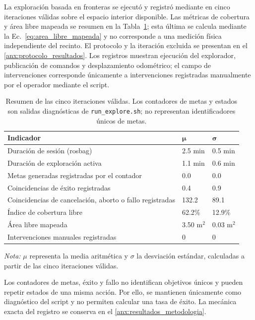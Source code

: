 La exploración basada en fronteras se ejecutó y registró mediante  en cinco iteraciones válidas sobre el espacio interior disponible. Las métricas de cobertura y área libre mapeada se resumen en la Tabla~\ref{tab:resumen_exploracion}; esta última se calcula mediante la Ec.~\eqref{eq:area_libre_mapeada} y no corresponde a una medición física independiente del recinto. El protocolo y la iteración excluida se presentan en el \ref{anx:protocolo_resultados}. Los registros muestran ejecución del explorador, publicación de comandos y desplazamiento odométrico; el campo de intervenciones corresponde únicamente a intervenciones registradas manualmente por el operador mediante el script.

\begin{table}[H]
\centering
\caption{Resumen de las cinco iteraciones válidas. Los contadores de metas y
estados son salidas diagnósticas de \texttt{run\_explore.sh}; no representan
identificadores únicos de metas.}
\label{tab:resumen_exploracion}
\small
\begin{tabular}{p{9.5cm} p{1.7cm} p{1.7cm}}
\toprule
\textbf{Indicador} & $\boldsymbol{\mu}$ & $\boldsymbol{\sigma}$ \\
\midrule
Duración de sesión (rosbag) & 2.5 min & 0.5 min \\
Duración de exploración activa & 1.1 min & 0.6 min \\
Metas generadas registradas por el contador & 0.0 & 0.0 \\
Coincidencias de éxito registradas & 0.4 & 0.9 \\
Coincidencias de cancelación, aborto o fallo registradas & 132.2 & 89.1 \\
Índice de cobertura libre & 62.2\% & 12.9\% \\
Área libre mapeada & 3.50 m$^2$ & 0.03 m$^2$ \\
Intervenciones manuales registradas & 0 & 0 \\
\bottomrule
\end{tabular}
\vspace{0.2cm}

\begin{minipage}{0.95\textwidth}
\footnotesize
\textit{Nota:} $\mu$ representa la media aritmética y $\sigma$ la desviación
estándar, calculadas a partir de las cinco iteraciones válidas.
\end{minipage}
\end{table}

Los contadores de metas, éxito y fallo no identifican objetivos únicos y
pueden repetir estados de una misma acción. Por ello, se mantienen únicamente
como diagnóstico del script y no permiten calcular una tasa de éxito. La
mecánica exacta del registro se conserva en el
\ref{anx:resultados_metodologia}.

